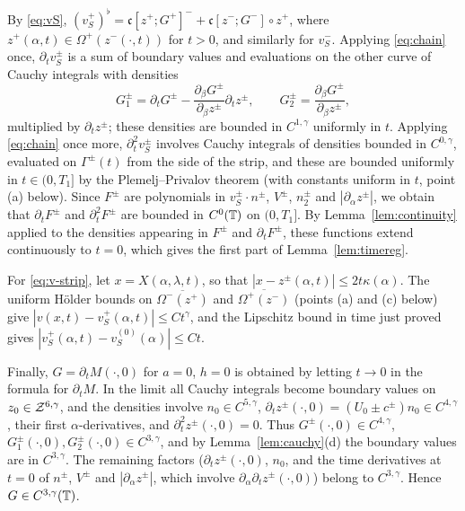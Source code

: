 By \eqref{eq:vS}, $(v_S^+)^\flat=\mathfrak c[z^+;G^+]^-+\mathfrak c[z^-;G^-]\circ z^+$, where $z^+(\alpha,t)\in\Omega^+(z^-(\cdot,t))$ for $t>0$, and similarly for $v_S^-$. Applying \eqref{eq:chain} once, $\partial_tv_S^\pm$
is a sum of boundary values and evaluations on the other curve of Cauchy integrals with densities
\[
G_1^\pm=\partial_tG^\pm-\frac{\partial_\beta G^\pm}{\partial_\beta z^\pm}\partial_tz^\pm,\qquad G_2^\pm=\frac{\partial_\beta G^\pm}{\partial_\beta z^\pm},
\]
multiplied by $\partial_tz^\pm$; these densities are bounded in $C^{1,\gamma}$ uniformly in $t$. Applying \eqref{eq:chain} once more, $\partial_t^2v_S^\pm$ involves Cauchy integrals of densities bounded in
$C^{0,\gamma}$, evaluated on $\Gamma^\pm(t)$ from the side of the strip, and these are bounded uniformly in $t\in(0,T_1]$ by the Plemelj--Privalov theorem (with constants uniform in $t$,
point (a) below). Since $F^\pm$ are polynomials in
$v_S^\pm\cdot n^\pm$, $V^\pm$, $n_2^\pm$ and $|\partial_\alpha z^\pm|$, we obtain that $\partial_tF^\pm$ and $\partial_t^2F^\pm$ are bounded in $C^0(\mathbb{T})$ on $(0,T_1]$. By Lemma~\ref{lem:continuity} applied to the
densities appearing in $F^\pm$ and $\partial_tF^\pm$, these functions extend continuously to $t=0$, which gives the first part of Lemma~\ref{lem:timereg}.

For \eqref{eq:v-strip}, let $x=X(\alpha,\lambda,t)$, so that $|x-z^\pm(\alpha,t)|\le2t\kappa(\alpha)$. The uniform Hölder bounds on $\overline{\Omega^-(z^+)}$ and $\overline{\Omega^+(z^-)}$ (points (a) and (c) below) give
$|v(x,t)-v_S^+(\alpha,t)|\le Ct^\gamma$, and the Lipschitz bound in time just proved gives $|v_S^+(\alpha,t)-v_S^{(0)}(\alpha)|\le Ct$.

Finally, $G=\partial_tM(\cdot,0)$ for $a=0$, $h=0$ is obtained by letting $t\to0$ in the formula for $\partial_tM$. In the limit all Cauchy integrals become boundary values on $z_0\in\mathcal{Z}^{6,\gamma}$, and
the densities involve $n_0\in C^{5,\gamma}$, $\partial_tz^\pm(\cdot,0)=(U_0\pm c^\pm)n_0\in C^{4,\gamma}$, their first $\alpha$-derivatives, and $\partial_t^2z^\pm(\cdot,0)=0$. Thus
$G^\pm(\cdot,0)\in C^{4,\gamma}$, $G_1^\pm(\cdot,0),G_2^\pm(\cdot,0)\in C^{3,\gamma}$, and by Lemma~\ref{lem:cauchy}(d) the boundary values are in $C^{3,\gamma}$. The remaining factors ($\partial_tz^\pm(\cdot,0)$, $n_0$,
and the time derivatives at $t=0$ of $n^\pm$, $V^\pm$ and $|\partial_\alpha z^\pm|$, which involve $\partial_\alpha\partial_tz^\pm(\cdot,0)$) belong to $C^{3,\gamma}$. Hence $G\in C^{3,\gamma}(\mathbb{T})$.


